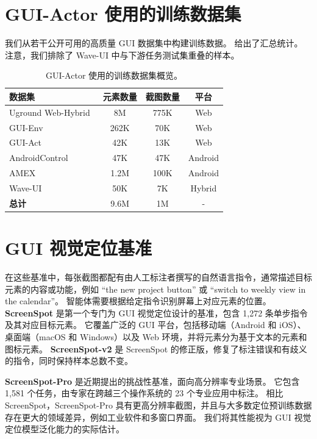 \documentclass{article}
\begin{document}
\section{GUI-Actor 使用的训练数据集}
\label{app:datasets}
我们从若干公开可用的高质量 GUI 数据集中构建训练数据。
 给出了汇总统计。
注意，我们排除了 Wave-UI 中与下游任务测试集重叠的样本。

\begin{table}[h]
\centering
\small
\caption{GUI-Actor 使用的训练数据集概览。}
\label{tab:train-data}
\begin{tabular}{lccc}
\toprule
\textbf{数据集} & \textbf{元素数量} & \textbf{截图数量} & \textbf{平台} \\
\midrule
Uground Web-Hybrid~\citep{gou2024navigating}    & 8M    & 775K  & Web \\
GUI-Env~\citep{chen2024guicourse}     & 262K  & 70K  & Web \\
GUI-Act~\citep{chen2024guicourse}          & 42K  & 13K   & Web \\
AndroidControl~\citep{li2024effects}  & 47K   & 47K   & Android \\
AMEX~\citep{chai2024amex}          & 1.2M   & 100K    & Android \\
Wave-UI\tablefootnote{\url{https://huggingface.co/datasets/agentsea/wave-ui}}         & 50K    & 7K    & Hybrid \\
\midrule
\textbf{总计}        & 9.6M   & 1M  & - \\
\bottomrule
\end{tabular}
\end{table}

\section{GUI 视觉定位基准}
\label{sec:grounding_benchmark}
在这些基准中，每张截图都配有由人工标注者撰写的自然语言指令，通常描述目标元素的内容或功能，例如 “the new project button” 或 “switch to weekly view in the calendar”。
智能体需要根据给定指令识别屏幕上对应元素的位置。
\textbf{ScreenSpot} 是第一个专门为 GUI 视觉定位设计的基准，包含 1,272 条单步指令及其对应目标元素。
它覆盖广泛的 GUI 平台，包括移动端（Android 和 iOS）、桌面端（macOS 和 Windows）以及 Web 环境，并将元素分为基于文本的元素和图标元素。
\textbf{ScreenSpot-v2} 是 ScreenSpot 的修正版，修复了标注错误和有歧义的指令，同时保持样本总数不变。

\textbf{ScreenSpot-Pro} 是近期提出的挑战性基准，面向高分辨率专业场景。
它包含 1,581 个任务，由专家在跨越三个操作系统的 23 个专业应用中标注。
相比 ScreenSpot，ScreenSpot-Pro 具有更高分辨率截图，并且与大多数定位预训练数据存在更大的领域差异，例如工业软件和多窗口界面。
我们将其性能视为 GUI 视觉定位模型泛化能力的实际估计。
\end{document}
